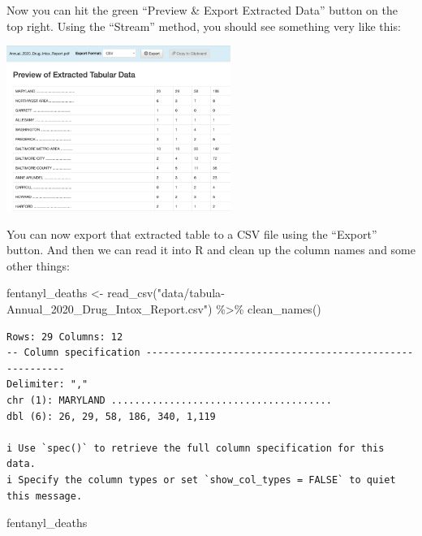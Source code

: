 \documentclass[
  letterpaper,
  DIV=11,
  numbers=noendperiod]{scrreprt}
\newenvironment{Shaded}{\begin{snugshade}}{\end{snugshade}}
\newcommand{\FunctionTok}[1]{\textcolor[rgb]{0.28,0.35,0.67}{#1}}
\newcommand{\NormalTok}[1]{\textcolor[rgb]{0.00,0.23,0.31}{#1}}
\newcommand{\OtherTok}[1]{\textcolor[rgb]{0.00,0.23,0.31}{#1}}
\newcommand{\SpecialCharTok}[1]{\textcolor[rgb]{0.37,0.37,0.37}{#1}}
\newcommand{\StringTok}[1]{\textcolor[rgb]{0.13,0.47,0.30}{#1}}
\begin{document}
Now you can hit the green ``Preview \& Export Extracted Data'' button on
the top right. Using the ``Stream'' method, you should see something
very like this:

\includegraphics[width=2.87in,height=\textheight]{./images/md_fentanyl_deaths_4.png}

You can now export that extracted table to a CSV file using the
``Export'' button. And then we can read it into R and clean up the
column names and some other things:

\begin{Shaded}
\begin{Highlighting}[]
\NormalTok{fentanyl\_deaths }\OtherTok{\textless{}{-}} \FunctionTok{read\_csv}\NormalTok{(}\StringTok{"data/tabula{-}Annual\_2020\_Drug\_Intox\_Report.csv"}\NormalTok{) }\SpecialCharTok{\%\textgreater{}\%} \FunctionTok{clean\_names}\NormalTok{()}
\end{Highlighting}
\end{Shaded}

\begin{verbatim}
Rows: 29 Columns: 12
-- Column specification --------------------------------------------------------
Delimiter: ","
chr (1): MARYLAND ......................................
dbl (6): 26, 29, 58, 186, 340, 1,119

i Use `spec()` to retrieve the full column specification for this data.
i Specify the column types or set `show_col_types = FALSE` to quiet this message.
\end{verbatim}

\begin{Shaded}
\begin{Highlighting}[]
\NormalTok{fentanyl\_deaths}
\end{Highlighting}
\end{Shaded}
\end{document}
